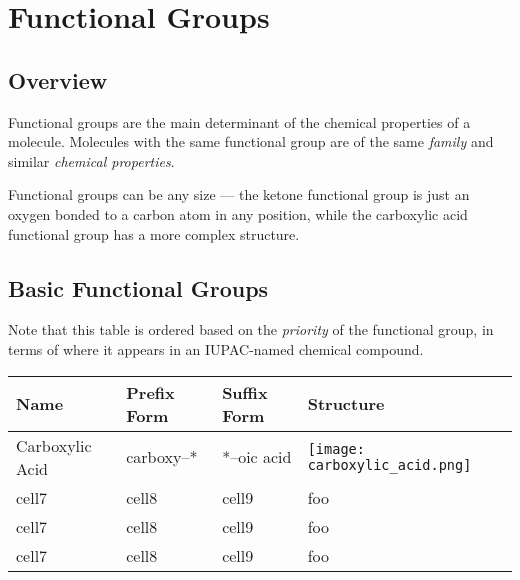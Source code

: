 



\section{ Functional Groups }
\subsection{ Overview }

Functional groups are the main determinant of the chemical properties of a molecule. Molecules with the
same functional group are of the same \textit{family} and similar \textit{chemical properties}.

Functional groups can be any size –– the ketone functional group is just an oxygen bonded to a carbon atom
in any position, while the carboxylic acid functional group has a more complex structure.



\pagebreak



\subsection{ Basic Functional Groups }

Note that this table is ordered based on the \textit{priority} of the functional group, in terms of where it appears in
an IUPAC-named chemical compound.

\begin{center}
\begin{table}[htbp]
	\renewcommand{\arraystretch}{1.25}
	\begin{tabu} to \textwidth {| X[c] | X[c] | X[c] | X[c] |}
		\hline
		Name				&		Prefix Form		&	Suffix Form		&	Structure \\ \hline

		Carboxylic Acid		&		carboxy–*		&	*–oic acid		&	\texttt{[image: carboxylic\_acid.png]} \\ \hline
		cell7 & cell8 & cell9 & foo \\ \hline
		cell7 & cell8 & cell9 & foo \\ \hline
		cell7 & cell8 & cell9 & foo \\ \hline
	\end{tabu}
\end{table}
\end{center}

